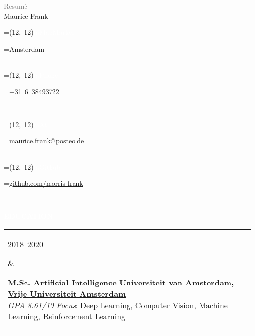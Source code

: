 \documentclass{article}
\newcommand{\vcenteredhbox}[1]{%
	\begingroup%
		\setbox0=\hbox{#1}\parbox{\wd0}{\box0}%
	\endgroup%
}
\newcommand{\icon}[3]{%
	\vcenteredhbox{\colorbox{primary}{\makebox(#2, #2){\textcolor{white}{\large\csname fa#1\endcsname}}}}%
	\hspace{0.2cm}%
	\vcenteredhbox{\textcolor{primary}{#3}}%
}
\newcommand{\cvsect}[1]{
	\vspace{\baselineskip}
	\colorbox{primary}{\textcolor{white}{\MakeUppercase{\textbf{#1}}}}\\
}
\newenvironment{entrylist}{
	\begin{longtable}[H]{l l}
}{
	\end{longtable}
}
\newcommand{\entry}[4]{%
	\parbox[t]{0.175\linewidth}{#1} &
	\parbox[t]{0.825\linewidth}{
		\textbf{#2}%
		\hfill%
		{\footnotesize \textbf{\textcolor{black}{#3}}}\\%
		{\small #4} %
    }\\\\}
\begin{document}
\begin{minipage}[t]{0.4\textwidth}
    \vspace{-\baselineskip}
    {\LARGE\textcolor{gray}{Resumé}}\\

    {\Huge Maurice Frank}
\end{minipage}
\begin{cvbox}
	\icon{MapMarker}{12}{Amsterdam}\\
	\icon{Phone}{12}{\href{tel:0031638493722}{+31 6 38493722}}\\
\end{cvbox}
\begin{cvbox}
    \icon{At}{12}{\href{mailto:maurice.frank@posteo.de}{maurice.frank@posteo.de}}\\
	\icon{Github}{12}{\href{https://github.com/morris-frank}{github.com/morris-frank}}\\
\end{cvbox}

\cvsect{Education}
\begin{entrylist}
    \entry{2018--2020}
    {M.Sc. Artificial Intelligence}
    {\href{https://uva.nl}{Universiteit van Amsterdam}, \href{https://vu.nl}{Vrije Universiteit Amsterdam}}
    {\textit{GPA 8.61/10} \quad \textit{Focus}: Deep Learning, Computer Vision, Machine Learning, Reinforcement Learning}

    \entry{2014--2017}
    {B.Sc. Applied Computer Science}
    {\href{https://www.uni-heidelberg.de/en}{University Heidelberg}}
    {\textit{GPA 3.48/4}\ \ \quad \textit{Focus}: Image processing and pattern recognition}

    \entry{2013--2014}
    {B.Sc. Physics}
    {\href{https://www.uni-heidelberg.de/en}{University Heidelberg}}
    {Change of degree after the second semester}

    \entry{2005--2013}
    {A levels}
    {\href{http://www.mpg-online.de/}{Max-Planck Gymnasium, Schorndorf}}
    {\textit{GPA B-}}
\end{entrylist}
\end{document}
